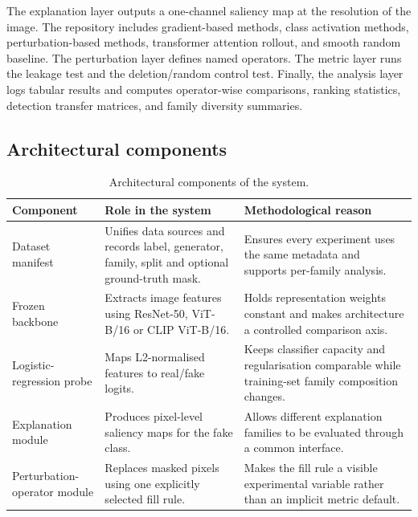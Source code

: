 The explanation layer outputs a one-channel saliency map at the
resolution of the image. The repository includes gradient-based methods,
class activation methods, perturbation-based methods, transformer
attention rollout, and smooth random baseline. The perturbation layer
defines named operators. The metric layer runs the leakage test and the
deletion/random control test. Finally, the analysis layer logs tabular
results and computes operator-wise comparisons, ranking statistics,
detection transfer matrices, and family diversity summaries.

\subsection{Architectural components}\label{architectural-components}

\begin{table}[H]
    \centering
    \caption{Architectural components of the system.}
    \label{tab:architectural-components}
    \small
    \begin{tabular}{@{}>{\raggedright\arraybackslash}p{}>{\raggedright\arraybackslash}p{}>{\raggedright\arraybackslash}p{}@{}}
        \toprule
        \textbf{Component} & \textbf{Role in the system} & \textbf{Methodological reason} \\
        \midrule
        Dataset manifest & Unifies data sources and records label, generator, family, split and optional ground-truth mask. & Ensures every experiment uses the same metadata and supports per-family analysis. \\
        \addlinespace
        Frozen backbone & Extracts image features using ResNet-50, ViT-B/16 or CLIP ViT-B/16. & Holds representation weights constant and makes architecture a controlled comparison axis. \\
        \addlinespace
        Logistic-regression probe & Maps L2-normalised features to real/fake logits. & Keeps classifier capacity and regularisation comparable while training-set family composition changes. \\
        \addlinespace
        Explanation module & Produces pixel-level saliency maps for the fake class. & Allows different explanation families to be evaluated through a common interface. \\
        \addlinespace
        Perturbation-operator module & Replaces masked pixels using one explicitly selected fill rule. & Makes the fill rule a visible experimental variable rather than an implicit metric default. \\

\end{tabular}
\end{table}
